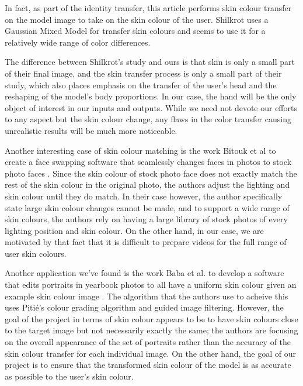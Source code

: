 In fact, as part of the identity transfer, this article performs skin colour transfer on the model image to take on the skin colour of the user. Shilkrot uses a Gaussian Mixed Model for transfer skin colours and seems to use it for a relatively wide range of color differences.

The difference between Shilkrot's study and ours is that skin is only a small part of their final image, and the skin transfer process is only a small part of their study, which also places emphasis on the transfer of the user's head and the reshaping of the model's body proportions. In our case, the hand will be the only object of interest in our inputs and outputs. While we need not devote our efforts to any aspect but the skin colour change, any flaws in the color transfer causing unrealistic results will be much more noticeable. 

Another interesting case of skin colour matching is the work Bitouk et al to create a face swapping software that seamlessly changes faces in photos to stock photo faces \cite{bitouk_2008_faceswap}. Since the skin colour of stock photo face does not exactly match the rest of the skin colour in the original photo, the authors adjust the lighting and skin colour until they do match. In their case however, the author specifically state large skin colour changes cannot be made, and to support a wide range of skin colours, the authors rely on having a large library of stock photos of every lighting position and skin colour. On the other hand, in our case, we are motivated by that fact that it is difficult to prepare videos for the full range of user skin colours.

Another application we've found is the work Baba et al. to develop a software that edits portraits in yearbook photos to all have a uniform skin colour given an example skin colour image \cite{baba_2015_yearbook}. The algorithm that the authors use to acheive this uses Pitié's colour grading algorithm and guided image filtering. However, the goal of the project in terms of skin colour appears to be to have skin colours close to the target image but not necessarily exactly the same; the authors are focusing on the overall appearance of the set of portraits rather than the accuracy of the skin colour transfer for each individual image. On the other hand, the goal of our project is to ensure that the transformed skin colour of the model is as accurate as possible to the user's skin colour.

